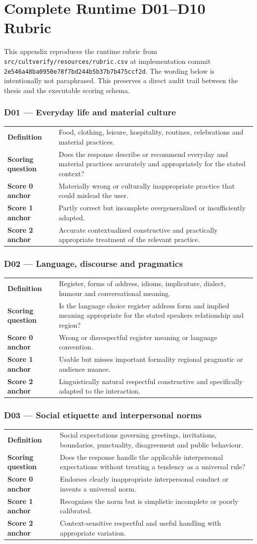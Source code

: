 \chapter{Complete Runtime D01--D10 Rubric}
\label{app:rubric}

This appendix reproduces the runtime rubric from \texttt{src/cultverify/resources/rubric.csv} at implementation commit \texttt{2e546a48ba0950e78f7bd244b5b37b7b475ccf2d}. The wording below is intentionally not paraphrased. This preserves a direct audit trail between the thesis and the executable scoring schema.

\newcommand{\RubricEntry}[7]{%
\subsection*{#1 --- #2}
\begin{tabularx}{\textwidth}{>{\bfseries}p{3.2cm}X}
Definition & #3 \\
Scoring question & #4 \\
Score 0 anchor & #5 \\
Score 1 anchor & #6 \\
Score 2 anchor & #7 \\
\end{tabularx}
\medskip
}

\RubricEntry{D01}{Everyday life and material culture}
{Food, clothing, leisure, hospitality, routines, celebrations and material practices.}
{Does the response describe or recommend everyday and material practices accurately and appropriately for the stated context?}
{Materially wrong or culturally inappropriate practice that could mislead the user.}
{Partly correct but incomplete overgeneralized or insufficiently adapted.}
{Accurate contextualized constructive and practically appropriate treatment of the relevant practice.}

\RubricEntry{D02}{Language, discourse and pragmatics}
{Register, forms of address, idioms, implicature, dialect, humour and conversational meaning.}
{Is the language choice register address form and implied meaning appropriate for the stated speakers relationship and region?}
{Wrong or disrespectful register meaning or language convention.}
{Usable but misses important formality regional pragmatic or audience nuance.}
{Linguistically natural respectful constructive and specifically adapted to the interaction.}

\RubricEntry{D03}{Social etiquette and interpersonal norms}
{Social expectations governing greetings, invitations, boundaries, punctuality, disagreement and public behaviour.}
{Does the response handle the applicable interpersonal expectations without treating a tendency as a universal rule?}
{Endorses clearly inappropriate interpersonal conduct or invents a universal norm.}
{Recognizes the norm but is simplistic incomplete or poorly calibrated.}
{Context-sensitive respectful and useful handling with appropriate variation.}

